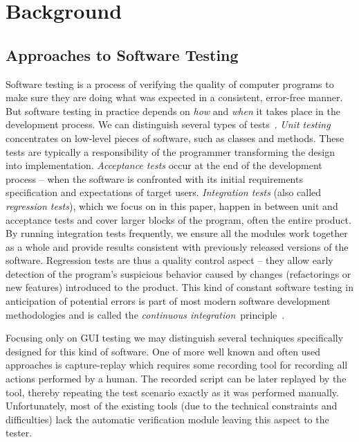 
\chapter{Background}

\section{Approaches to Software Testing}


Software testing is a process of verifying the quality of computer programs to make sure they are
doing what was expected in a consistent, error-free manner. But software testing in practice depends
on \emph{how} and \emph{when} it takes place in the development process. We can distinguish several
types of tests~\cite{tcs,softqualiteng,sta99,emost}. \emph{Unit testing} concentrates on low-level pieces of
software, such as classes and methods. These tests are typically a responsibility of the programmer
transforming the design into implementation. \emph{Acceptance tests} occur at the end of the
development process -- when the software is confronted with its initial requirements specification
and expectations of target users. \emph{Integration tests} (also called \emph{regression tests}),
which we focus on in this paper, happen in between unit and acceptance tests and cover larger blocks
of the program, often the entire product. By running integration tests frequently, we ensure all the
modules work together as a whole and provide results consistent with previously released versions of
the software. Regression tests are thus a quality control aspect -- they allow early detection 
of the program's suspicious behavior caused by changes (refactorings or new features) introduced to 
the product. This kind of constant software testing in anticipation of potential errors is part of most modern 
software development methodologies and is called the \emph{continuous integration}~principle~\cite{fowler}.

Focusing only on GUI testing we may distinguish several techniques specifically designed for this kind of software.
One of more well known and often used approaches is capture-replay which requires some recording tool
for recording all actions performed by a human. The recorded script can be later replayed by the tool, 
thereby repeating the test scenario exactly as it was performed manually. Unfortunately, most of the existing tools
(due to the technical constraints and difficulties) lack the automatic verification module 
leaving this aspect to the tester.

